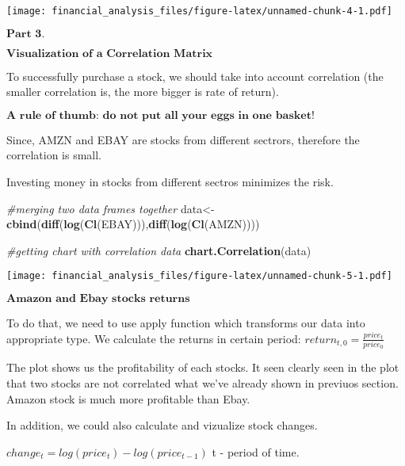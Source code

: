 \documentclass[]{article}
\newenvironment{Shaded}{\begin{snugshade}}{\end{snugshade}}
\newcommand{\KeywordTok}[1]{\textcolor[rgb]{0.13,0.29,0.53}{\textbf{#1}}}
\newcommand{\CommentTok}[1]{\textcolor[rgb]{0.56,0.35,0.01}{\textit{#1}}}
\newcommand{\NormalTok}[1]{#1}
\begin{document}
\texttt{[image: financial\_analysis\_files/figure-latex/unnamed-chunk-4-1.pdf]}

\(\textbf{Part 3.}\)

\(\textbf{Visualization of a Correlation Matrix}\)

To successfully purchase a stock, we should take into account
correlation (the smaller correlation is, the more bigger is rate of
return).

\(\textbf{A rule of thumb: do not put all your eggs in one basket!}\)

Since, AMZN and EBAY are stocks from different sectrors, therefore the
correlation is small.

Investing money in stocks from different sectros minimizes the risk.

\begin{Shaded}
\begin{Highlighting}[]
\CommentTok{#merging two data frames together}
\NormalTok{data<-}\KeywordTok{cbind}\NormalTok{(}\KeywordTok{diff}\NormalTok{(}\KeywordTok{log}\NormalTok{(}\KeywordTok{Cl}\NormalTok{(EBAY))),}\KeywordTok{diff}\NormalTok{(}\KeywordTok{log}\NormalTok{(}\KeywordTok{Cl}\NormalTok{(AMZN))))}

\CommentTok{#getting chart with correlation data}
\KeywordTok{chart.Correlation}\NormalTok{(data)}
\end{Highlighting}
\end{Shaded}

\texttt{[image: financial\_analysis\_files/figure-latex/unnamed-chunk-5-1.pdf]}

\(\textbf{Amazon and Ebay stocks returns}\)

To do that, we need to use apply function which transforms our data into
appropriate type. We calculate the returns in certain period:
\(return_{t, 0} = \frac{price_t}{price_0}\)

The plot shows us the profitability of each stocks. It seen clearly seen
in the plot that two stocks are not correlated what we've already shown
in previuos section. Amazon stock is much more profitable than Ebay.

In addition, we could also calculate and vizualize stock changes.

\(change_t = log(price_t) - log(price_{t - 1})\) t - period of time.
\end{document}
